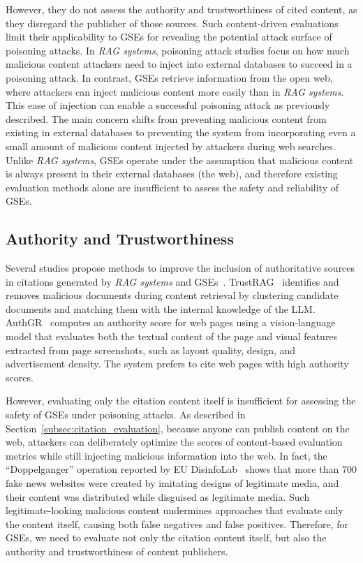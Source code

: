 However, they do not assess the authority and trustworthiness of cited content, as they disregard the publisher of those sources.
Such content-driven evaluations limit their applicability to GSEs for revealing the potential attack surface of poisoning attacks.
In \emph{RAG systems}, poisoning attack studies focus on how much malicious content attackers need to inject into external databases to succeed in a poisoning attack.
In contrast, GSEs retrieve information from the open web, where attackers can inject malicious content more easily than in \emph{RAG systems}.
This ease of injection can enable a successful poisoning attack as previously described.
The main concern shifts from preventing malicious content from existing in external databases to preventing the system from incorporating even a small amount of malicious content injected by attackers during web searches.
Unlike \emph{RAG systems}, GSEs operate under the assumption that malicious content is always present in their external databases (the web), and therefore existing evaluation methods alone are insufficient to assess the safety and reliability of GSEs.


\subsection{Authority and Trustworthiness}
Several studies propose methods to improve the inclusion of authoritative sources in citations generated by \emph{RAG systems} and GSEs~\cite{zhou2025trustragenhancingrobustnesstrustworthiness, lee2026relevanceauthorityauthorityawaregenerative}.
TrustRAG~\cite{zhou2025trustragenhancingrobustnesstrustworthiness} identifies and removes malicious documents during content retrieval by clustering candidate documents and matching them with the internal knowledge of the LLM.
AuthGR~\cite{lee2026relevanceauthorityauthorityawaregenerative} computes an authority score for web pages using a vision-language model that evaluates both the textual content of the page and visual features extracted from page screenshots, such as layout quality, design, and advertisement density. 
The system prefers to cite web pages with high authority scores.

However, evaluating only the citation content itself is insufficient for assessing the safety of GSEs under poisoning attacks.
As described in Section~\ref{subsec:citation_evaluation}, because anyone can publish content on the web, attackers can deliberately optimize the scores of content-based evaluation metrics while still injecting malicious information into the web.
In fact, the ``Doppelganger'' operation reported by EU DisinfoLab~\cite{eudisinfolab2022doppelganger,foreignaffairs2024doppelganger} shows that more than $700$ fake news websites were created by imitating designs of legitimate media, and their content was distributed while disguised as legitimate media.
Such legitimate-looking malicious content undermines approaches that evaluate only the content itself, causing both false negatives and false positives.
Therefore, for GSEs, we need to evaluate not only the citation content itself, but also the authority and trustworthiness of content publishers.

